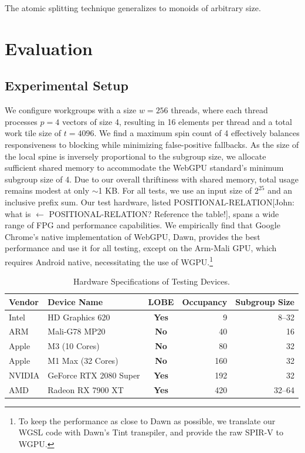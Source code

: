 \documentclass[acmsmall, manuscript, screen, review, anonymous]{acmart}
\newcommand{\john}[1]{{\footnotesize\color{cyan}[John: #1]}}
\begin{document}
The atomic splitting technique generalizes to monoids of arbitrary size.

\section{Evaluation}
\subsection{Experimental Setup}
We configure workgroups with a size $w = 256$ threads, where each thread processes $p = 4$ vectors of size 4, resulting in 16 elements per thread and a total work tile size of $t = 4096$. We find a maximum spin count of 4 effectively balances responsiveness to blocking while minimizing false-positive fallbacks. As the size of the local spine is inversely proportional to the subgroup size, we allocate sufficient shared memory to accommodate the WebGPU standard's minimum subgroup size of 4. Due to our overall thriftiness with shared memory, total usage remains modest at only $\sim$1 KB\@. For all tests, we use an input size of $2^{25}$ and an inclusive prefix sum. Our test hardware, listed POSITIONAL-RELATION\john{what is $\leftarrow$ POSITIONAL-RELATION\@? Reference the table!}, spans a wide range of FPG and performance capabilities. We empirically find that Google Chrome's native implementation of WebGPU, Dawn, provides the best performance and use it for all testing, except on the Arm-Mali GPU, which requires Android native, necessitating the use of WGPU\@.\footnote{To keep the performance as close to Dawn as possible, we translate our WGSL code with Dawn's Tint transpiler, and provide the raw SPIR-V to WGPU\@.}
\begin{table}
  \centering
  \begin{tabular}{l l c r r}
    \toprule
    Vendor & Device Name            & LOBE         & Occupancy & Subgroup Size \\
    \midrule
    Intel  & HD Graphics 620        & \textbf{Yes} & 9         & 8--32         \\
    ARM    & Mali-G78 MP20          & \textbf{No}  & 40        & 16            \\
    Apple  & M3     (10 Cores)      & \textbf{No}  & 80        & 32            \\
    Apple  & M1 Max (32 Cores)      & \textbf{No}  & 160       & 32            \\
    NVIDIA & GeForce RTX 2080 Super & \textbf{Yes} & 192       & 32            \\
    AMD    & Radeon RX 7900 XT      & \textbf{Yes} & 420       & 32--64        \\
    \bottomrule
  \end{tabular}
  \caption{Hardware Specifications of Testing Devices.\label{tab:hardware}}
\end{table}
\end{document}
